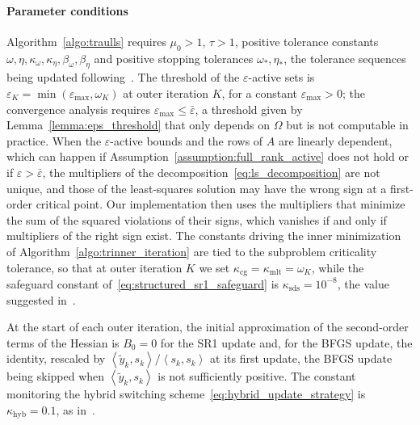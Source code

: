 \documentclass[pdflatex,sn-mathphys-num]{sn-jnl}%
\theoremstyle{thmstyleone}%
\newcommand{\inner}[2]{\left\langle {#1} , {#2} \right\rangle} %
\begin{document}
\paragraph*{Parameter conditions} 
Algorithm~\ref{algo:traulls} requires $\mu_0 > 1$, $\tau > 1$, positive tolerance constants $\omega,\eta,\kappa_\omega,\kappa_\eta,\beta_\omega,\beta_\eta$ and positive stopping tolerances $\omega_*,\eta_*$, the tolerance sequences being updated following~\cite[Algorithm~14.4.2]{conn-etal:2000}. The threshold of the $\varepsilon$-active sets is $\varepsilon_K = \min(\varepsilon_{\max},\omega_K)$ at outer iteration $K$, for a constant $\varepsilon_{\max} > 0$; the convergence analysis requires $\varepsilon_{\max} \le \bar\varepsilon$, a threshold given by Lemma~\ref{lemma:eps_threshold} that only depends on $\Omega$ but is not computable in practice. When the $\varepsilon$-active bounds and the rows of $A$ are linearly dependent, which can happen if Assumption~\ref{assumption:full_rank_active} does not hold or if $\varepsilon > \bar\varepsilon$, the multipliers of the decomposition~\eqref{eq:ls_decomposition} are not unique, and those of the least-squares solution may have the wrong sign at a first-order critical point. Our implementation then uses the multipliers that minimize the sum of the squared violations of their signs, which vanishes if and only if multipliers of the right sign exist. The constants driving the inner minimization of Algorithm~\ref{algo:trinner_iteration} are tied to the subproblem criticality tolerance, so that at outer iteration $K$ we set $\kappa_{\mathrm{cg}} = \kappa_{\mathrm{mlt}} = \omega_K$, while the safeguard constant of~\eqref{eq:structured_sr1_safeguard} is $\kappa_{\mathrm{sds}} = 10^{-8}$, the value suggested in~\cite[Section~6.2]{nocedalwright:2006}.

At the start of each outer iteration, the initial approximation of the second-order terms of the Hessian is $B_0 = 0$ for the SR1 update and, for the BFGS update, the identity, rescaled by $\inner{\tilde{y}_k}{s_k}/\inner{s_k}{s_k}$ at its first update, the BFGS update being skipped when $\inner{\tilde{y}_k}{s_k}$ is not sufficiently positive. The constant monitoring the hybrid switching scheme~\eqref{eq:hybrid_update_strategy} is $\kappa_{\mathrm{hyb}} = 0.1$, as in~\cite{tjoabiegler:1991}.
\end{document}
